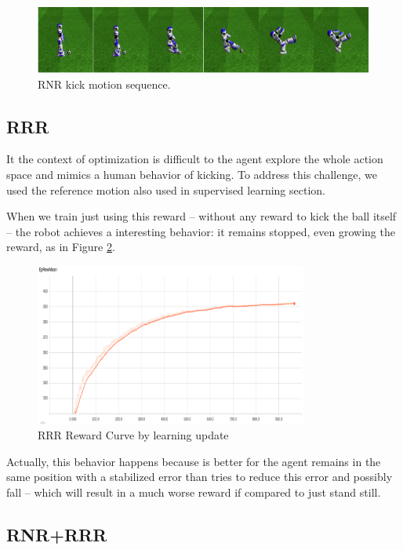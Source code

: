 \begin{figure}[!htbp]
	\centering
	\includegraphics[width=1.0\textwidth]{Cap6/rnr_kick_sequence.eps}
	\caption{RNR kick motion sequence.}
	\label{fig:rnr_kick_sequence}
\end{figure}

\subsection{RRR}

It the context of optimization is difficult to the agent explore the whole action space and mimics a human behavior of kicking. To address this challenge, we used the reference motion also used in supervised learning section.

When we train just using this reward -- without any reward to kick the ball itself -- the robot achieves a interesting behavior: it remains stopped, even growing the reward, as in Figure \ref{fig:rrrreward}.

\begin{figure}[!htbp]
	\centering
	\includegraphics[width=0.8\textwidth]{Cap6/rrrreward.eps}
	\caption{RRR Reward Curve by learning update}
	\label{fig:rrrreward}
\end{figure}

Actually, this behavior happens because is better for the agent remains in the same position with a stabilized error than tries to reduce this error and possibly fall -- which will result in a much worse reward if compared to just stand still.

\subsection{RNR+RRR}

